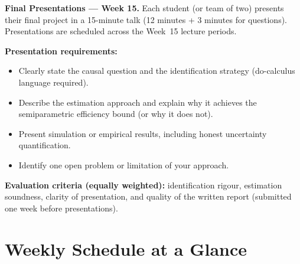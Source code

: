\documentclass[12pt]{article}
\begin{document}
\begin{presentbox}
\noindent\textbf{\color{darkblue}Final Presentations --- Week 15.}
Each student (or team of two) presents their final project in a 15-minute
talk (12 minutes + 3 minutes for questions).  Presentations are scheduled
across the Week~15 lecture periods.

\medskip
\noindent\textbf{Presentation requirements:}
\begin{itemize}
  \item Clearly state the causal question and the identification strategy
    (do-calculus language required).
  \item Describe the estimation approach and explain why it achieves the
    semiparametric efficiency bound (or why it does not).
  \item Present simulation or empirical results, including honest
    uncertainty quantification.
  \item Identify one open problem or limitation of your approach.
\end{itemize}

\noindent\textbf{Evaluation criteria (equally weighted):}
identification rigour, estimation soundness, clarity of presentation,
and quality of the written report (submitted one week before
presentations).
\end{presentbox}

\section{Weekly Schedule at a Glance}

\begingroup
\small
\setlength{\tabcolsep}{5pt}
\renewcommand{\arraystretch}{1.35}
\end{document}
